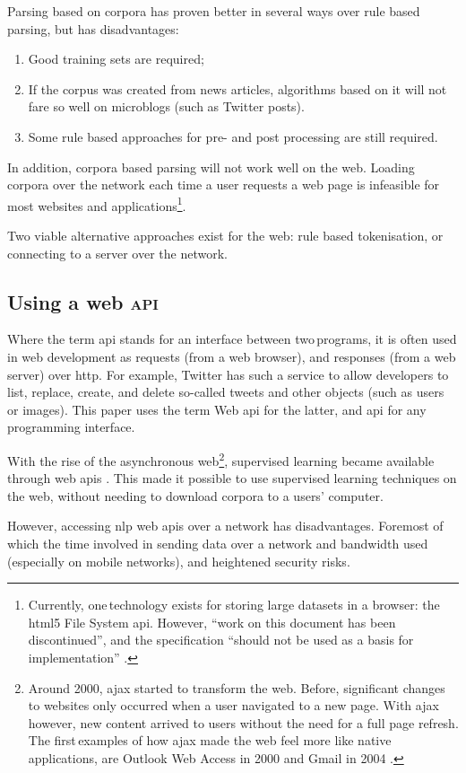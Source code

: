 Parsing based on corpora has proven better in several ways over rule based
  parsing, but has disadvantages:

\begin{enumerate}
\item Good training sets are required;
\item If the corpus was created from news articles, algorithms based on it
  will not fare so well on microblogs (such as Twitter posts).
\item Some rule based approaches for pre- and post processing are still
  required.
\end{enumerate}

\noindent In addition, corpora based parsing will not work well on the web.
Loading corpora over the network each time a user requests a web page is
  infeasible for most websites and applications\footnote{Currently,
    one\,technology exists for storing large datasets in a browser: the
    \acrshort{html5} File System \acrshort{api}. However, ``work on this
    document has been discontinued'', and the specification ``should not be
    used as a basis for implementation'' \autocite{urhane-file-api}.}.

Two viable alternative approaches exist for the web: rule based tokenisation,
  or connecting to a server over the network.

\subsection{Using a web \textsc{api}}\label{using-a-web}

Where the term \gls{api} stands for an interface between two\,programs,
  it is often used in web development as requests (from a web browser),
  and responses (from a web server) over \gls{http}.
For example, Twitter has such a service to allow developers to list,
  replace, create, and delete so-called tweets and other objects (such as
  users or images).
This paper uses the term Web \gls{api} for the latter, and \gls{api} for
any programming interface.

With the rise of the asynchronous web\footnote{Around 2000,
    \gls{ajax} started to transform the web.
  Before, significant changes to websites only occurred when a user
    navigated to a new page. 
  With \gls{ajax} however, new content arrived to users without the need
    for a full page refresh. The first\,examples of how \gls{ajax} made
    the web feel more like native applications, are Outlook Web
    Access in 2000 \autocite{technet-outlook-web-access} and Gmail in 2004
    \autocite{gmailblog-gmail-ajax}.},
  supervised learning became available through web \glspl{api}
  \autocites{textteaser-web-api}{wordnet-web-api}{textrazor-web-api}.
This made it possible to use supervised learning techniques on the web,
  without needing to download corpora to a users' computer.

However, accessing \gls{nlp} web \glspl{api} over a network has
  disadvantages.
Foremost of which the time involved in sending data over a network and
  bandwidth used (especially on mobile networks), and heightened security
  risks.
